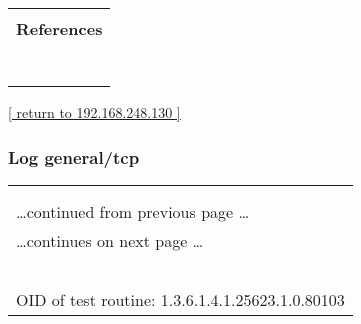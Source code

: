 \documentclass{article}
\begin{document}
\begin{longtable}{|p{}|}
      \hline
      \\
\textbf{References}\\
\rowcolor{white}{\verb=CVE: CVE-2012-0814=}\\
\rowcolor{white}{\verb=BID:51702=}\\
\rowcolor{white}{\verb=Other:=}\\
\rowcolor{white}{\verb=  URL:http://www.securityfocus.com/bid/51702=}\\
\rowcolor{white}{\verb=   URL:http://bugs.debian.org/cgi-bin/bugreport.cgi?bug=\verb-=-\verb=657445=}\\
\rowcolor{white}{\verb=   URL:http://packages.debian.org/squeeze/openssh-server=}\\
\rowcolor{white}{\verb=   URL:https://downloads.avaya.com/css/P8/documents/100161262=}\\
\end{longtable}

\begin{footnotesize}\hyperref[host:192.168.248.130]{[ return to 192.168.248.130 ]}\end{footnotesize}
\subsubsection{Log general/tcp}
\label{port:192.168.248.130 general/tcp Log}

\begin{longtable}{|p{}|}
\hline
\rowcolor{openvas_log}{\color{white}{Log (CVSS: 7.8) }}\\
\rowcolor{openvas_log}{\color{white}{NVT: 3com switch2hub}}\\
\hline
\endfirsthead
\hfill\ldots continued from previous page \ldots \\
\hline
\endhead
\hline
\ldots continues on next page \ldots \\
\endfoot
\hline
\endlastfoot
\\
\rowcolor{white}{\verb=Fake IP address not specified. Skipping this check. =}\\
\rowcolor{white}{\verb==}\\
\rowcolor{white}{\verb==}\\
\\
OID of test routine: 1.3.6.1.4.1.25623.1.0.80103\\
\end{longtable}
\end{document}
